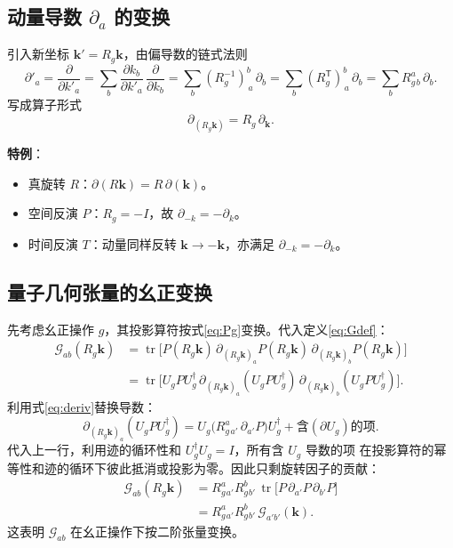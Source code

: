 \subsection{动量导数 \(\partial_a\) 的变换}

引入新坐标 \(\mathbf{k}' = R_g\mathbf{k}\)，由偏导数的链式法则
\[
  \partial'_a
  = \frac{\partial}{\partial k'_a}
  = \sum_{b} \frac{\partial k_b}{\partial k'_a}\,\frac{\partial}{\partial k_b}
  = \sum_{b} (R_g^{-1})^b_{\,a}\,\partial_b
  = \sum_{b} (R_g^{\mathsf{T}})^b_{\,a}\,\partial_b
  = \sum_{b} R_g^{a}{}_b\,\partial_b .
\]
写成算子形式
\begin{equation}
{\partial_{(R_g\mathbf{k})} = R_g\,\partial_{\mathbf{k}} } .
  \label{eq:deriv}
\end{equation}

\textbf{特例}：
\begin{itemize}
  \item 真旋转 \(R\)：\(\partial(R\mathbf{k}) = R\,\partial(\mathbf{k})\)。
  \item 空间反演 \(P\)：\(R_g = -I\)，故 \(\partial_{-k} = -\partial_k\)。
  \item 时间反演 \(T\)：动量同样反转 \(\mathbf{k}\to -\mathbf{k}\)，亦满足
        \(\partial_{-k} = -\partial_k\)。
\end{itemize}

\subsection{量子几何张量的幺正变换}

先考虑幺正操作 \(g\)，其投影算符按式\eqref{eq:Pg}变换。代入定义\eqref{eq:Gdef}：
\begin{align}
  \mathcal{G}_{ab}(R_g\mathbf{k})
  &= \operatorname{tr}\bigl[ P(R_g\mathbf{k})\,
     \partial_{(R_g\mathbf{k})_a} P(R_g\mathbf{k})\,
     \partial_{(R_g\mathbf{k})_b} P(R_g\mathbf{k}) \bigr] \nonumber\\
  &= \operatorname{tr}\bigl[ U_g P U_g^\dagger\,
     \partial_{(R_g\mathbf{k})_a}(U_g P U_g^\dagger)\,
     \partial_{(R_g\mathbf{k})_b}(U_g P U_g^\dagger) \bigr].
\end{align}
利用式\eqref{eq:deriv}替换导数：
\[
  \partial_{(R_g\mathbf{k})_a}(U_g P U_g^\dagger)
  = U_g \bigl( R_g^{a}{}_{a'}\,\partial_{a'}P \bigr) U_g^\dagger
  + \text{含}(\partial U_g)\text{的项}.
\]
代入上一行，利用迹的循环性和 \(U_g^\dagger U_g = I\)，所有含 \(U_g\) 导数的项
在投影算符的幂等性和迹的循环下彼此抵消或投影为零。因此只剩旋转因子的贡献：
\begin{align}
  \mathcal{G}_{ab}(R_g\mathbf{k})
  &= R_g^{a}{}_{a'} R_g^{b}{}_{b'}\,
     \operatorname{tr}\bigl[ P\,\partial_{a'}P\,\partial_{b'}P \bigr] \nonumber\\
  &= R_g^{a}{}_{a'} R_g^{b}{}_{b'}\, \mathcal{G}_{a'b'}(\mathbf{k}).
  \label{eq:Gg_unitary}
\end{align}
这表明 \(\mathcal{G}_{ab}\) 在幺正操作下按二阶张量变换。

